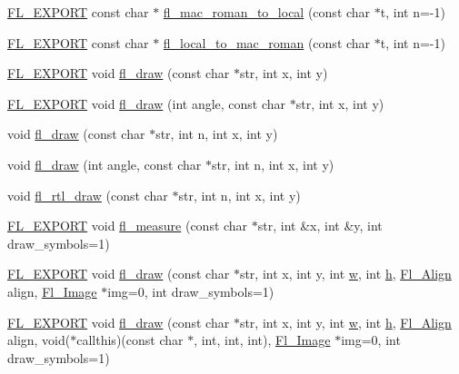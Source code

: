 \begin{DoxyCompactItemize}
\hyperlink{_fl___export_8_h_aa9ba29a18aee9d738370a06eeb4470fc}{F\+L\+\_\+\+E\+X\+P\+O\+RT} const char $\ast$ \hyperlink{group__fl__attributes_ga0d34a59a5d378d83e9b41887b8145481}{fl\+\_\+mac\+\_\+roman\+\_\+to\+\_\+local} (const char $\ast$t, int n=-\/1)
\item 
\hyperlink{_fl___export_8_h_aa9ba29a18aee9d738370a06eeb4470fc}{F\+L\+\_\+\+E\+X\+P\+O\+RT} const char $\ast$ \hyperlink{group__fl__attributes_gaac5f521ee634fdd70f6e286479ebab32}{fl\+\_\+local\+\_\+to\+\_\+mac\+\_\+roman} (const char $\ast$t, int n=-\/1)
\item 
\hyperlink{_fl___export_8_h_aa9ba29a18aee9d738370a06eeb4470fc}{F\+L\+\_\+\+E\+X\+P\+O\+RT} void \hyperlink{group__fl__drawings_gacf054f0c5c5d3ab6caa1e8be3d58ec7e}{fl\+\_\+draw} (const char $\ast$str, int x, int y)
\item 
\hyperlink{_fl___export_8_h_aa9ba29a18aee9d738370a06eeb4470fc}{F\+L\+\_\+\+E\+X\+P\+O\+RT} void \hyperlink{group__fl__drawings_gacf5b5ca37f2f40d7229413d9fc52c875}{fl\+\_\+draw} (int angle, const char $\ast$str, int x, int y)
\item 
void \hyperlink{group__fl__drawings_gae4ac5a0bc231f239e45dc1552b5ee738}{fl\+\_\+draw} (const char $\ast$str, int n, int x, int y)
\item 
void \hyperlink{group__fl__drawings_ga14f28b302c1adf1f6dc76efbd6275a50}{fl\+\_\+draw} (int angle, const char $\ast$str, int n, int x, int y)
\item 
void \hyperlink{group__fl__drawings_ga4ea048fa98815420272fe661f7c0d993}{fl\+\_\+rtl\+\_\+draw} (const char $\ast$str, int n, int x, int y)
\item 
\hyperlink{_fl___export_8_h_aa9ba29a18aee9d738370a06eeb4470fc}{F\+L\+\_\+\+E\+X\+P\+O\+RT} void \hyperlink{group__fl__drawings_gaccd92d0c0521b0aac30dcb856d438dcd}{fl\+\_\+measure} (const char $\ast$str, int \&x, int \&y, int draw\+\_\+symbols=1)
\item 
\hyperlink{_fl___export_8_h_aa9ba29a18aee9d738370a06eeb4470fc}{F\+L\+\_\+\+E\+X\+P\+O\+RT} void \hyperlink{group__fl__drawings_ga0c1fe5be700c7b7079caf5dfd9fde9cd}{fl\+\_\+draw} (const char $\ast$str, int x, int y, int \hyperlink{forms_8_h_aac374e320caaadeca4874add33b62af2}{w}, int \hyperlink{forms_8_h_a7e427ba5b307f9068129699250690066}{h}, \hyperlink{_enumerations_8_h_a44e8bcd1e030e65e4f88cbae64a7c3e3}{Fl\+\_\+\+Align} align, \hyperlink{class_fl___image}{Fl\+\_\+\+Image} $\ast$img=0, int draw\+\_\+symbols=1)
\item 
\hyperlink{_fl___export_8_h_aa9ba29a18aee9d738370a06eeb4470fc}{F\+L\+\_\+\+E\+X\+P\+O\+RT} void \hyperlink{group__fl__drawings_ga21d4007e0096cfa9c9906ebb373fa8ee}{fl\+\_\+draw} (const char $\ast$str, int x, int y, int \hyperlink{forms_8_h_aac374e320caaadeca4874add33b62af2}{w}, int \hyperlink{forms_8_h_a7e427ba5b307f9068129699250690066}{h}, \hyperlink{_enumerations_8_h_a44e8bcd1e030e65e4f88cbae64a7c3e3}{Fl\+\_\+\+Align} align, void($\ast$callthis)(const char $\ast$, int, int, int), \hyperlink{class_fl___image}{Fl\+\_\+\+Image} $\ast$img=0, int draw\+\_\+symbols=1)

\end{DoxyCompactItemize}
